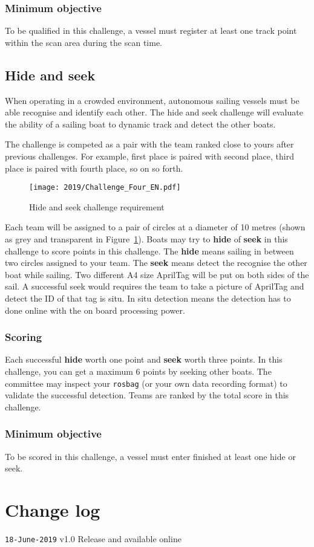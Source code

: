 \documentclass[12pt]{article}
\begin{document}
\subsubsection{Minimum objective}
To be qualified in this challenge, a vessel must register at least one track
point within the scan area during the scan time.

\subsection{Hide and seek}
When operating in a crowded environment, autonomous sailing vessels must be able
recognise and identify each other. 
The hide and seek challenge will evaluate the ability of a sailing boat to dynamic 
track and detect the other boats.

The challenge is competed as a pair with the team ranked close to yours after previous challenges.
For example, first place is paired with second place, third place is paired with fourth place, so on so forth.


  \begin{figure}[H]
    \centering
    \texttt{[image: 2019/Challenge\_Four\_EN.pdf]}
    \caption{Hide and seek challenge requirement}
    \label{fig:hideandseek}
  \end{figure}

Each team will be assigned to a pair of circles at a diameter of 10 metres (shown as grey and transparent in Figure~\ref{fig:hideandseek}).
Boats may try to \textbf{hide} of \textbf{seek} in this challenge to score points in this challenge.
The \textbf{hide} means sailing in between two circles assigned to your team.
The \textbf{seek} means detect the recognise the other boat while sailing.
Two different A4 size AprilTag will be put on both sides of the sail.
A successful seek would requires the team to take a picture of AprilTag and detect the ID of that tag is situ.
In situ detection means the detection has to done online with the on board processing power. 


\subsubsection{Scoring}

Each successful \textbf{hide} worth one point and \textbf{seek} worth three points.
In this challenge, you can get a maximum 6 points by seeking other boats.
The committee may inspect your \texttt{rosbag} (or your own data recording format) to validate the successful detection. 
Teams are ranked by the total score in this challenge.


\subsubsection{Minimum objective}
To be scored in this challenge, a vessel must enter finished at least one hide or seek. 


\section*{Change log}

\texttt{18-June-2019} v1.0 Release and available online
\end{document}
